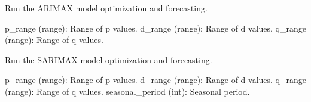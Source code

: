 \documentclass[letterpaper,10pt,english]{sphinxmanual}
\begin{document}
\begin{fulllineitems}
\begin{fulllineitems}
\begin{description}
\end{description}

\end{fulllineitems}


\begin{fulllineitems}
\label{\detokenize{Mainwindow:Mainwindow.MainWindow.run_arimax}}
\pysigstartsignatures
{}
\pysigstopsignatures
\sphinxAtStartPar
Run the ARIMAX model optimization and forecasting.
\begin{description}
\sphinxAtStartPar
p\_range (range): Range of p values.
d\_range (range): Range of d values.
q\_range (range): Range of q values.

\end{description}

\end{fulllineitems}


\begin{fulllineitems}
\label{\detokenize{Mainwindow:Mainwindow.MainWindow.run_sarimax}}
\pysigstartsignatures
{}
\pysigstopsignatures
\sphinxAtStartPar
Run the SARIMAX model optimization and forecasting.
\begin{description}
\sphinxAtStartPar
p\_range (range): Range of p values.
d\_range (range): Range of d values.
q\_range (range): Range of q values.
seasonal\_period (int): Seasonal period.

\end{description}


\end{fulllineitems}
\end{fulllineitems}
\end{document}
